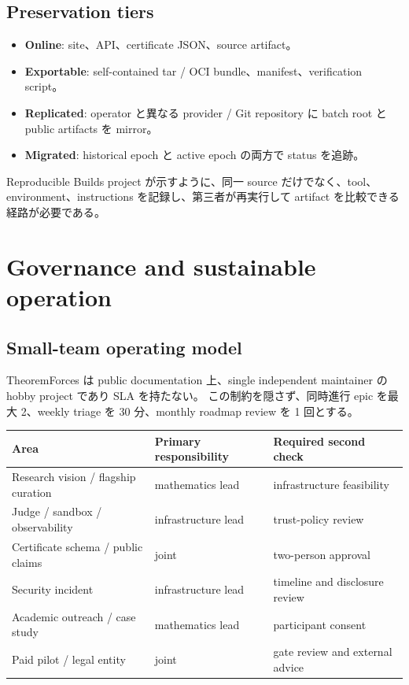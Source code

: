 \documentclass[a4paper,11pt]{ltjsarticle}
\newcommand{\term}[1]{\textbf{\color{TFNavy}#1}}
\begin{document}
\subsection{Preservation tiers}

\begin{itemize}
  \item \term{Online}: site、API、certificate JSON、source artifact。
  \item \term{Exportable}: self-contained tar / OCI bundle、manifest、verification script。
  \item \term{Replicated}: operator と異なる provider / Git repository に batch root と public artifacts を mirror。
  \item \term{Migrated}: historical epoch と active epoch の両方で status を追跡。
\end{itemize}

Reproducible Builds project が示すように、同一 source だけでなく、tool、environment、instructions を記録し、第三者が再実行して
artifact を比較できる経路が必要である\cite{reprobuilds}。

\section{Governance and sustainable operation}

\subsection{Small-team operating model}

TheoremForces は public documentation 上、single independent maintainer の hobby project であり SLA を持たない\cite{tfabout}。
この制約を隠さず、同時進行 epic を最大 2、weekly triage を 30 分、monthly roadmap review を 1 回とする。

\begin{tabularx}{0.96\linewidth}{L{48mm}YY}
\toprule
\textbf{Area} & \textbf{Primary responsibility} & \textbf{Required second check} \\
\midrule
Research vision / flagship curation & mathematics lead & infrastructure feasibility \\
Judge / sandbox / observability & infrastructure lead & trust-policy review \\
Certificate schema / public claims & joint & two-person approval \\
Security incident & infrastructure lead & timeline and disclosure review \\
Academic outreach / case study & mathematics lead & participant consent \\
Paid pilot / legal entity & joint & gate review and external advice \\
\bottomrule
\end{tabularx}
\end{document}

